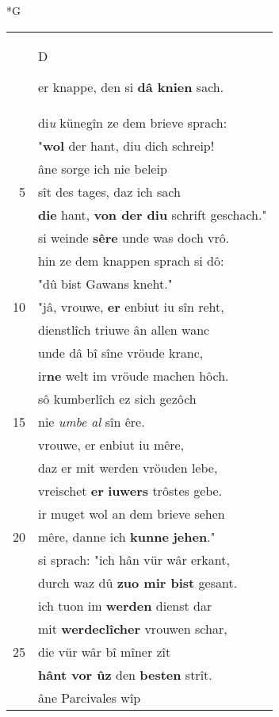 \documentclass[8pt,a4paper,notitlepage]{article}
\begin{document}
\begin{table}[ht]
\begin{minipage}[t]{0.5\linewidth}
\small
\begin{center}*G
\end{center}
\begin{tabular}{rl}
 & \begin{large}D\end{large}er knappe, den si \textbf{dâ knien} sach.\\ 
 & di\textit{u} künegîn ze dem brieve sprach:\\ 
 & "\textbf{wol} der hant, diu dich schreip!\\ 
 & âne sorge ich nie beleip\\ 
5 & sît des tages, daz ich sach\\ 
 & \textbf{die} hant, \textbf{von der diu} schrift geschach."\\ 
 & si weinde \textbf{sêre} unde was doch vrô.\\ 
 & hin ze dem knappen sprach si dô:\\ 
 & "dû bist Gawans kneht."\\ 
10 & "jâ, vrouwe, \textbf{er} enbiut iu sîn reht,\\ 
 & dienstlîch triuwe ân allen wanc\\ 
 & unde dâ bî sîne vröude kranc,\\ 
 & ir\textbf{ne} welt im vröude machen hôch.\\ 
 & sô kumberlîch ez sich gezôch\\ 
15 & nie \textit{umbe al} sîn êre.\\ 
 & vrouwe, er enbiut iu mêre,\\ 
 & daz er mit werden vröuden lebe,\\ 
 & vreischet \textbf{er} \textbf{iuwers} trôstes gebe.\\ 
 & ir muget wol an dem brieve sehen\\ 
20 & mêre, danne ich \textbf{kunne} \textbf{jehen}."\\ 
 & si sprach: "ich hân vür wâr erkant,\\ 
 & durch waz dû \textbf{zuo mir bist} gesant.\\ 
 & ich tuon im \textbf{werden} dienst dar\\ 
 & mit \textbf{werdeclîcher} vrouwen schar,\\ 
25 & die vür wâr bî mîner zît\\ 
 & \textbf{hânt vor ûz} den \textbf{besten} strît.\\ 
 & âne Parcivales wîp\\ 

\end{tabular}
\end{minipage}
\end{table}
\end{document}
